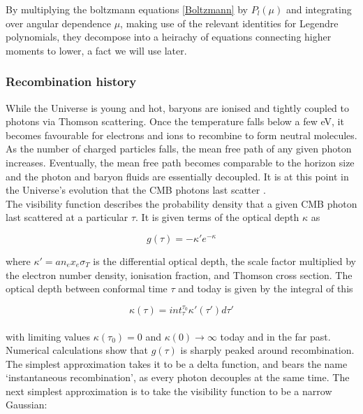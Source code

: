 \documentclass[a4paper,10pt]{article}
\begin{document}
By multiplying the boltzmann equations \ref{Boltzmann} by $P_l(\mu)$ and integrating over angular dependence $\mu$, making use of the relevant identities for Legendre polynomials, they decompose into a heirachy of equations connecting higher moments to lower, a fact we will use later.

\subsubsection{Recombination history}

While the Universe is young and hot, baryons are ionised and tightly coupled to photons via Thomson scattering. Once the temperature falls below a few eV, it becomes favourable for electrons and ions to recombine to form neutral molecules. As the number of charged particles falls, the mean free path of any given photon increases. Eventually, the mean free path becomes comparable to the horizon size and the photon and baryon fluids are essentially decoupled. It is at this point in the Universe’s evolution that the CMB photons last scatter \cite{Pritchard}.\\

The visibility function describes the probability density that a given CMB photon last scattered at a particular $\tau$. It is given terms of the optical depth $\kappa$ as

\begin{equation}
g(\tau) = -\kappa'e^{-\kappa}
\end{equation}

where $\kappa' = an_ex_e\sigma_T$ is the differential optical depth, the scale factor multiplied by the electron number density, ionisation fraction, and Thomson cross section. The optical depth between conformal time $\tau$ and today is given by the integral of this 

\begin{equation}
\kappa(\tau) = int_\tau^{\tau_0} \kappa'(\tau')d\tau'
\end{equation}\\

with limiting values $\kappa(\tau_0) = 0$ and $\kappa(0)\rightarrow \infty$ today and in the far past. Numerical calculations show that $g(\tau)$ is sharply peaked around recombination. The simplest approximation takes it to be a delta function, and bears the name `instantaneous recombination', as every photon decouples at the same time. The next simplest approximation is to take the visibility function to be a narrow Gaussian:
\end{document}

